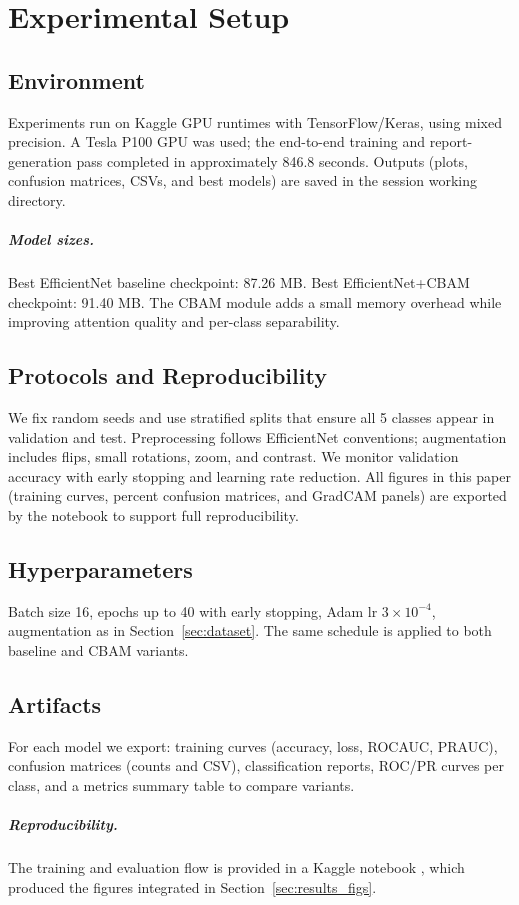 \chapter{Experimental Setup}
\section{Environment}
Experiments run on Kaggle GPU runtimes with TensorFlow/Keras, using mixed precision. A Tesla P100 GPU was used; the end-to-end training and report-generation pass completed in approximately 846.8 seconds. Outputs (plots, confusion matrices, CSVs, and best models) are saved in the session working directory.

\paragraph{Model sizes.} Best EfficientNet baseline checkpoint: 87.26 MB. Best EfficientNet+CBAM checkpoint: 91.40 MB. The CBAM module adds a small memory overhead while improving attention quality and per-class separability.

\section{Protocols and Reproducibility}
We fix random seeds and use stratified splits that ensure all 5 classes appear in validation and test. Preprocessing follows EfficientNet conventions; augmentation includes flips, small rotations, zoom, and contrast. We monitor validation accuracy with early stopping and learning rate reduction. All figures in this paper (training curves, percent confusion matrices, and Grad\textendash CAM panels) are exported by the notebook \cite{takrimNotebook} to support full reproducibility.

\section{Hyperparameters}
Batch size 16, epochs up to 40 with early stopping, Adam lr $3\times10^{-4}$, augmentation as in Section~\ref{sec:dataset}. The same schedule is applied to both baseline and CBAM variants.

\section{Artifacts}
For each model we export: training curves (accuracy, loss, ROC\textendash AUC, PR\textendash AUC), confusion matrices (counts and CSV), classification reports, ROC/PR curves per class, and a metrics summary table to compare variants.

\paragraph{Reproducibility.} The training and evaluation flow is provided in a Kaggle notebook \cite{takrimNotebook}, which produced the figures integrated in Section~\ref{sec:results_figs}.

